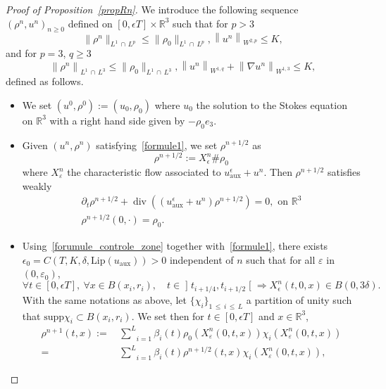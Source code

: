 \documentclass[10pt]{amsart}
\theoremstyle{definition}\newtheorem{defi}[theo]{Definition}\newtheorem{rema}[theo]{Remark}\newtheorem{exam}[theo]{Example}\newtheorem{exem}[theo]{Example}\newtheorem{nota}[theo]{Notation}
\newcommand{\Lip}{\mathrm{Lip}}
\newcommand{\supp}{\mathrm{supp} }
\newcommand{\aux}{\mathrm{aux}}
\newcommand{\R}{\mathbb{R}}
\renewcommand{\leq}{\leqslant}
\renewcommand{\geq}{\geqslant}
\renewcommand{\div}{\operatorname{div}}
\newcommand{\eps}{\epsilon}
\let\oldforall\forall
\renewcommand*{\forall}{\mathrel{\oldforall}}
\begin{document}
\begin{proof}[Proof of Proposition~\ref{propRn}]
We introduce the following sequence $(\rho^n,u^n)_{n \geq 0}$ defined on $[0,\eps T]\times \R^3$ such that for $p>3$
\begin{equation}\label{formule1}
\|\rho^n\|_{L^1\,\cap\,L^p} \leq \|\rho_0\|_{L^1\,\cap \,L^p}, \left\|u^n\right\|_{W^{2,p}} \leq K,
\end{equation}
and for $p=3$, $q\geq 3$
\begin{equation}\label{formule1_bis}
\left\|\rho^n\right\|_{L^1\,\cap\,L^3} \leq \|\rho_0\|_{L^1\,\cap\,L^3}, \left\|u^n\right\|_{W^{1,q}}+\left\|\nabla u^n\right\|_{W^{1,3}} \leq K,
\end{equation}
defined as follows.
\begin{itemize}
\item We set $(u^0,\rho^0):=(u_0,\rho_0)$ where $u_0$ the solution to the Stokes equation on $\R^3$ with a right hand side given by $-\rho_0e_3$.
\item Given $(u^n,\rho^n)$ satisfying~\eqref{formule1}, we set $\rho^{n+1/2}$ as
\[
\rho^{n+1/2}:=X_\epsilon^n \# \rho_0
\]
where $X^n_\varepsilon$ the characteristic flow associated to $u^\eps_\aux+u^n $. Then $\rho^{n+1/2}$ satisfies weakly
\begin{align*}
\partial_t \rho^{n+1/2}+ \div \left((u^\eps_\aux+u^n)\rho^{n+1/2}\right)=0, {\text{ on } \R^3 }\\
\rho^{n+1/2}(0,\cdot)=\rho_0.
\end{align*}
\item Using~\eqref{forumule_controle_zone} together with~\eqref{formule1}, there exists $\epsilon_0=C(T,K,\delta, \Lip(u_\aux))>0$ independent of $n$ such that for all $\varepsilon$ in $(0, \varepsilon_0)$,
\begin{equation}\label{formule2}
\forall t \in [0,\eps T],\: \forall x\in B(x_i,r_i), \quad t \in\mathopen]t_{i+1/4},t_{i+1/2}\mathclose[\Rightarrow X^n_\eps(t,0,x)\in B(0,3 \delta).
\end{equation}
With the same notations as above, let $\{ \chi_i \}_{1 \,\leq\,i\,\leq\,L}$ a partition of unity such that $\supp \chi_i \subset B(x_i, r_i)$. We set then for $t\in[0,\eps T]$ and $x\in \R^3$,
\begin{align*}
\rho^{n+1}(t,x){:=}& \,\underset{i=1}{\overset{L}{\sum}}\beta_i(t) \rho_0(X^n_\varepsilon(0,t,x)) \chi_i(X^n_\varepsilon(0,t,x))\\
=&\,\underset{i=1}{\overset{L}{\sum}}\beta_i(t) \rho^{n+1/2}(t,x) \chi_i(X^n_\varepsilon(0,t,x)),

\end{align*}
\end{itemize}
\end{proof}
\end{document}
